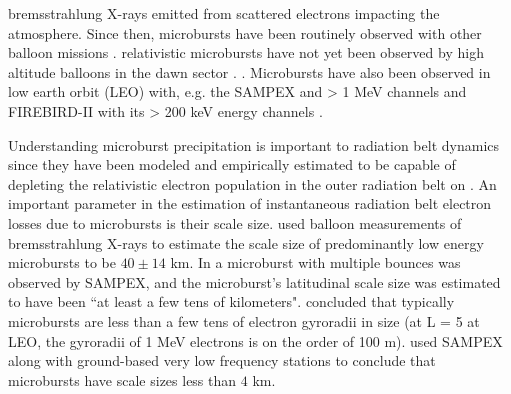 \documentclass[draft, linenumbers]{agujournal}
\begin{document}
 \citet{Anderson1964}   bremsstrahlung X-rays emitted from scattered  electrons impacting the atmosphere. Since then,  microbursts have been routinely observed with other balloon missions \citep{Parks1967, Woodger2015, Anderson2017}.  relativistic microbursts have not yet been observed by high altitude balloons in the dawn sector \citep{Millan2002, Millan2007}.  \citep{Lee2012}. Microbursts have also been observed in low earth orbit (LEO) with, e.g. the SAMPEX  and > 1 MeV channels \citep{Nakamura1995, Nakamura2000, Blake1996, Lorentzen2001a, Lorentzen2001b, O'Brien2003, O'Brien2004, Blum2015} and FIREBIRD-II with its > 200 keV energy channels \citep{Crew2016, Anderson2017, Breneman2017}.  

Understanding microburst precipitation is important to radiation belt dynamics since they have been modeled and empirically estimated to be capable of depleting the relativistic electron population in the outer radiation belt on  \citep{O'Brien2004, Thorne2005, Shprits2007, Breneman2017}. An important parameter in the estimation of instantaneous radiation belt electron losses due to microbursts is their scale size. \citet{Parks1967} used balloon measurements of bremsstrahlung X-rays to estimate the scale size of predominantly low energy microbursts to be $40 \pm 14$ km. In \citet{Blake1996} a microburst with multiple bounces was observed by  SAMPEX, and the microburst's latitudinal scale size was estimated to have been ``at least a few tens of kilometers".  concluded that typically microbursts are less than a few tens of electron gyroradii in size (at L = 5 at LEO, the gyroradii of 1 MeV electrons is on the order of 100 m). \citet{Dietrich2010} used SAMPEX along with ground-based very low frequency stations to conclude that microbursts have scale sizes less than $4$ km.
\end{document}
